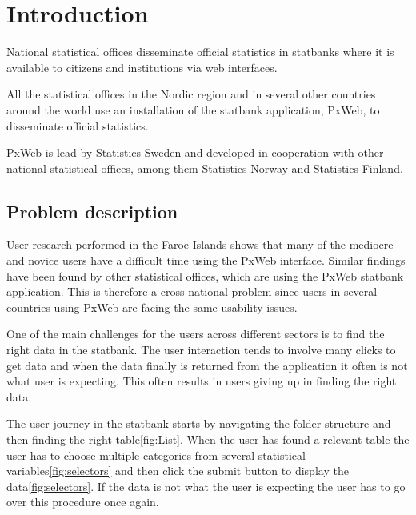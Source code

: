 \chapter{Introduction}

National statistical offices disseminate official statistics in statbanks where it is available to citizens and institutions via web interfaces.
 
All the statistical offices in the Nordic region and in several other countries around the world use an installation of the statbank application, PxWeb, to disseminate official statistics.
 
PxWeb is lead by Statistics Sweden and developed in cooperation with other national statistical offices, among them Statistics Norway and Statistics Finland.

\section{Problem description}
User research performed in the Faroe Islands shows that many of the mediocre and novice users have a difficult time using the PxWeb interface. Similar findings have been found by other statistical offices, which are using the PxWeb statbank application. This is therefore a cross-national problem since users in several countries using PxWeb are facing the same usability issues.
 
One of the main challenges for the users across different sectors is to find the right data in the statbank. The user interaction tends to involve many clicks to get data and when the data finally is returned from the application it often is not what user is expecting. This often results in users giving up in finding the right data.
 
The user journey in the statbank starts by navigating the folder structure and then finding the right table\ref{fig:List}. When the user has found a relevant table the user has to choose multiple categories from several statistical variables\ref{fig:selectors} and then click the submit button to display the data\ref{fig:selectors}. If the data is not what the user is expecting the user has to go over this procedure once again.

